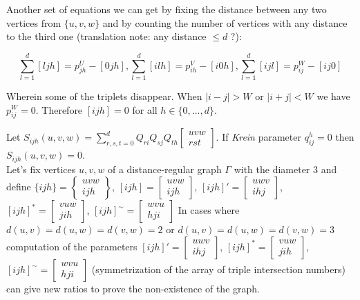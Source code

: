 \documentclass{article}
\theoremstyle{definition}
\theoremstyle{definition}
\theoremstyle{remark}
\begin{document}
Another set of equations we can get by fixing the distance between any two vertices from $\{u,v,w\}$ and by counting the number of vertices with any distance to the third one (translation note: any distance $\le d$ ?):


\[
    \sum_{l=1}^d [ljh] = p_{jh}^U - [0jh],
    \sum_{l=1}^d [ilh] = p_{ih}^V - [i0h],
    \sum_{l=1}^d [ijl] = p_{ij}^W - [ij0]
\label{eq:plus}
\tag{+}
\]

Wherein some of the triplets disappear. When $|i-j|>W$ or $|i+j|<W$ we have $p_{ij}^W = 0$. Therefore $[ijh]=0$ for all $h \in \{0, ..., d\}$.

Let $S_{ijh}(u,v,w) = \sum_{r,s,t=0}^d Q_{ri}Q_{sj}Q_{th} \begin{bmatrix}
    u v w \\
    r s t \end{bmatrix}$.
If {\it Krein } parameter $q_{ij}^h = 0$ then $S_{ijh}(u,v,w) = 0$.
\\

Let's fix vertices $u, v, w$ of a distance-regular graph $\Gamma$ with the diameter $3$ and define
$ \{ijh\} = \begin{Bmatrix} uvw \\ ijh \end{Bmatrix}$,
$ [ijh] = \begin{bmatrix} uvw \\ ijh \end{bmatrix}$,
$ [ijh]' = \begin{bmatrix} uwv \\ ihj \end{bmatrix}$,
$ [ijh]^* = \begin{bmatrix} vuw \\ jih \end{bmatrix}$,
$ [ijh]^{\sim} = \begin{bmatrix} wvu \\ hji \end{bmatrix}$
In cases where $d(u,v) = d(u,w) = d(v, w) = 2$ or $d(u,v) = d(u,w) = d(v, w) = 3$ computation of the parameters
$ [ijh]' = \begin{bmatrix} uwv \\ ihj \end{bmatrix}$,
$ [ijh]^* = \begin{bmatrix} vuw \\ jih \end{bmatrix}$,
$ [ijh]^{\sim} = \begin{bmatrix} wvu \\ hji \end{bmatrix}$
(symmetrization of the array of triple intersection numbers) can give new ratios to prove the non-existence of the graph.
\end{document}
